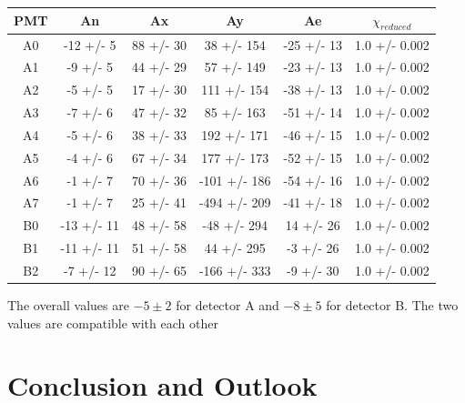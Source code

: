 \begin{table}[t!]
\centering
\begin{tabular}{c|c|c|c|c|c}
\hline
 PMT   & An         & Ax        & Ay           & Ae         & $\chi _{reduced}$   \\
\hline
 A0    & -12 +/- 5  & 88 +/- 30 & 38 +/- 154   & -25 +/- 13 & 1.0 +/- 0.002   \\
 A1    & -9 +/- 5   & 44 +/- 29 & 57 +/- 149   & -23 +/- 13 & 1.0 +/- 0.002   \\
 A2    & -5 +/- 5   & 17 +/- 30 & 111 +/- 154  & -38 +/- 13 & 1.0 +/- 0.002   \\
 A3    & -7 +/- 6   & 47 +/- 32 & 85 +/- 163   & -51 +/- 14 & 1.0 +/- 0.002   \\
 A4    & -5 +/- 6   & 38 +/- 33 & 192 +/- 171  & -46 +/- 15 & 1.0 +/- 0.002   \\
 A5    & -4 +/- 6   & 67 +/- 34 & 177 +/- 173  & -52 +/- 15 & 1.0 +/- 0.002   \\
 A6    & -1 +/- 7   & 70 +/- 36 & -101 +/- 186 & -54 +/- 16 & 1.0 +/- 0.002   \\
 A7    & -1 +/- 7   & 25 +/- 41 & -494 +/- 209 & -41 +/- 18 & 1.0 +/- 0.002   \\
 B0    & -13 +/- 11 & 48 +/- 58 & -48 +/- 294  & 14 +/- 26  & 1.0 +/- 0.002   \\
 B1    & -11 +/- 11 & 51 +/- 58 & 44 +/- 295   & -3 +/- 26  & 1.0 +/- 0.002   \\
 B2    & -7 +/- 12  & 90 +/- 65 & -166 +/- 333 & -9 +/- 30  & 1.0 +/- 0.002   \\
\hline
\end{tabular}
\end{table}

The overall values are $-5 \pm 2$ for detector A and $-8 \pm 5$ for detector B. The two values are compatible with each other

\section{Conclusion and Outlook} 


